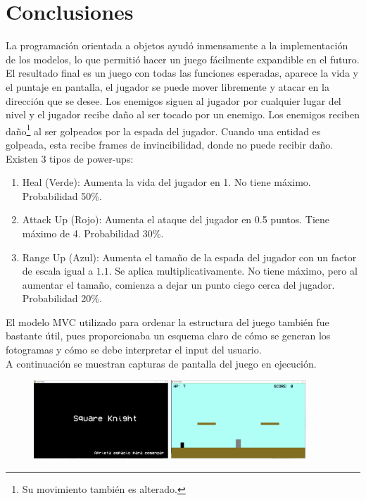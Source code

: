 \documentclass[letterpaper,11pt]{article} %
\begin{document}
\section{Conclusiones}
	La programación orientada a objetos ayudó inmensamente a la implementación de los modelos, lo que permitió hacer un juego fácilmente expandible en el futuro. El resultado final es un juego con todas las funciones esperadas, aparece la vida y el puntaje en pantalla, el jugador se puede mover libremente y atacar en la dirección que se desee. Los enemigos siguen al jugador por cualquier lugar del nivel y el jugador recibe daño al ser tocado por un enemigo. Los enemigos reciben daño\footnote{Su movimiento también es alterado.} al ser golpeados por la espada del jugador. Cuando una entidad es golpeada, esta recibe frames de invincibilidad, donde no puede recibir daño. Existen 3 tipos de power-ups:
	\begin{enumerate}
		\item Heal (Verde):
		Aumenta la vida del jugador en 1. No tiene máximo. Probabilidad 50\%.
		\item Attack Up (Rojo):
		Aumenta el ataque del jugador en 0.5 puntos. Tiene máximo de 4. Probabilidad 30\%.
		\item Range Up (Azul):
		Aumenta el tamaño de la espada del jugador con un factor de escala igual a $1.1$. Se aplica multiplicativamente. No tiene máximo, pero al aumentar el tamaño, comienza a dejar un punto ciego cerca del jugador. Probabilidad 20\%.
	\end{enumerate}

	El modelo MVC utilizado para ordenar la estructura del juego también fue bastante útil, pues proporcionaba un esquema claro de cómo se generan los fotogramas y cómo se debe interpretar el input del usuario.\\

	A continuación se muestran capturas de pantalla del juego en ejecución.

	\begin{figure}[H]
		\centering
		\includegraphics[width=0.45\textwidth]{images/screencap_01}
		\hfill
		\includegraphics[width=0.45\textwidth]{images/screencap_02}
	\end{figure}
\end{document}
